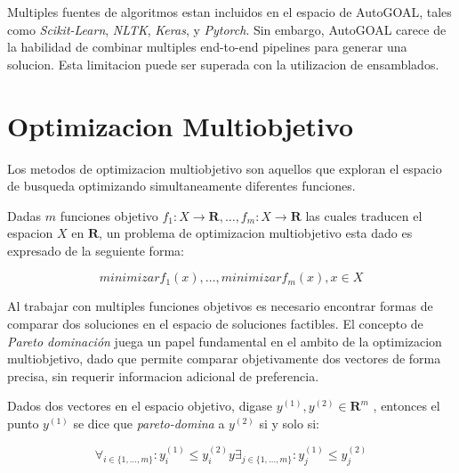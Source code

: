 Multiples fuentes de algoritmos estan incluidos en el espacio de AutoGOAL, tales como \textit{Scikit-Learn}\cite{pedregosa2011scikit}, \textit{NLTK}\cite{nltk}, \textit{Keras}\cite{chollet2015keras}, y \textit{Pytorch}\cite{paszke2019pytorch}. Sin embargo, AutoGOAL carece de la habilidad de combinar multiples end-to-end pipelines para generar una solucion. Esta limitacion puede ser superada con la utilizacion de ensamblados.

\section{Optimizacion Multiobjetivo}\label{section:multiobjective}

Los metodos de optimizacion multiobjetivo son aquellos que exploran el espacio de busqueda optimizando simultaneamente diferentes funciones.

\begin{definition}
\label{definition:multiobjective}

    Dadas $m$ funciones objetivo $f_1: X \rightarrow \mathbf{R}, \dots, f_m: X \rightarrow \mathbf{R}$ las cuales traducen el espacion $X$ en $\mathbf{R}$, un problema de optimizacion multiobjetivo esta dado es expresado de la seguiente forma:

    \begin{equation}
        minimizar f_1(x), \dots, minimizar f_m(x), x \in X
    \end{equation}
\end{definition}

Al trabajar con multiples funciones objetivos es necesario encontrar formas de comparar dos soluciones en el espacio de soluciones factibles. El concepto de \textit{Pareto dominaci\'on} juega un papel fundamental en el ambito de la optimizacion multiobjetivo, dado que permite comparar objetivamente dos vectores de forma precisa, sin requerir informacion adicional de preferencia.

\begin{definition}
\label{definition:pareto-dominance}

    Dados dos vectores en el espacio objetivo, digase $y^{(1)}, y^{(2)} \in \mathbf{R}^m$ , entonces el punto $y^{(1)}$ se dice que \emph{pareto-domina} a $y^{(2)}$ si y solo si:

    \begin{equation}
        \forall_{i\in\{1,\dots,m\}}: y_i^{(1)} \leq y_i^{(2)} y \exists_{j\in\{1,\dots,m\}}: y_j^{(1)} \le y_j^{(2)}
    \end{equation}
\end{definition}


